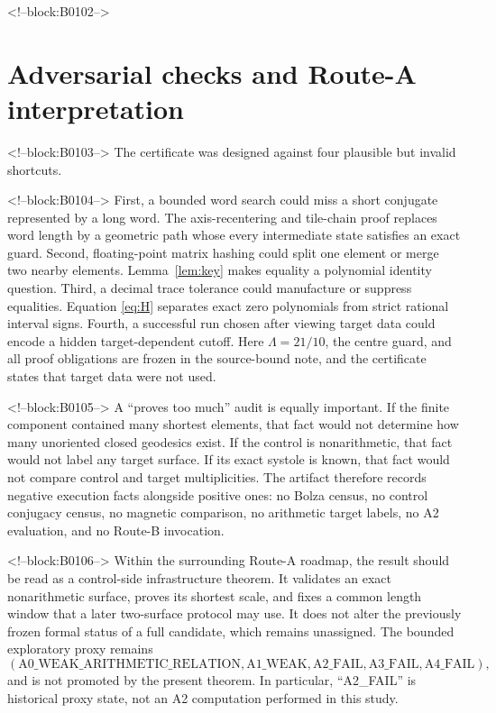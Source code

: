 \documentclass[11pt,a4paper]{article}
\theoremstyle{definition}
\begin{document}
<!--block:B0102-->
\section{Adversarial checks and Route-A interpretation}

<!--block:B0103-->
The certificate was designed against four plausible but invalid shortcuts.

<!--block:B0104-->
First, a bounded word search could miss a short conjugate represented by a
long word.  The axis-recentering and tile-chain proof replaces word length by
a geometric path whose every intermediate state satisfies an exact guard.
Second, floating-point matrix hashing could split one element or merge two
nearby elements.  Lemma~\ref{lem:key} makes equality a polynomial identity
question.  Third, a decimal trace tolerance could manufacture or suppress
equalities.  Equation \eqref{eq:H} separates exact zero polynomials from
strict rational interval signs.  Fourth, a successful run chosen after
viewing target data could encode a hidden target-dependent cutoff.  Here
\(\Lambda=21/10\), the centre guard, and all proof obligations are frozen in
the source-bound note, and the certificate states that target data were not
used.

<!--block:B0105-->
A ``proves too much'' audit is equally important.  If the finite component
contained many shortest elements, that fact would not determine how many
unoriented closed geodesics exist.  If the control is nonarithmetic, that fact
would not label any target surface.  If its exact systole is known, that fact
would not compare control and target multiplicities.  The artifact therefore
records negative execution facts alongside positive ones: no Bolza census,
no control conjugacy census, no magnetic comparison, no arithmetic target
labels, no A2 evaluation, and no Route-B invocation.

<!--block:B0106-->
Within the surrounding Route-A roadmap, the result should be read as a
control-side infrastructure theorem.  It validates an exact nonarithmetic
surface, proves its shortest scale, and fixes a common length window that a
later two-surface protocol may use.  It does not alter the previously frozen
formal status of a full candidate, which remains unassigned.  The bounded
exploratory proxy remains
\[
 (\mathrm{A0\_WEAK\_ARITHMETIC\_RELATION},
  \mathrm{A1\_WEAK},
  \mathrm{A2\_FAIL},
  \mathrm{A3\_FAIL},
  \mathrm{A4\_FAIL}),
\]
and is not promoted by the present theorem.  In particular, ``A2\_FAIL'' is
historical proxy state, not an A2 computation performed in this study.
\end{document}

